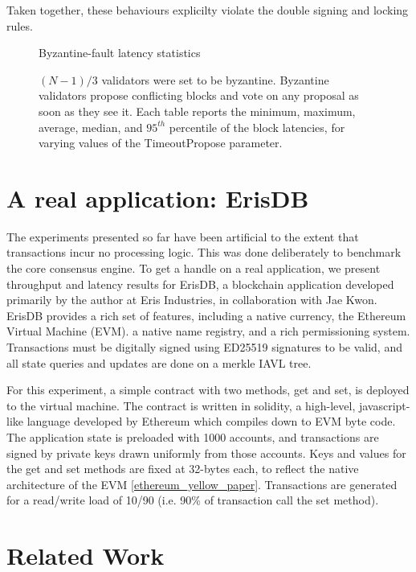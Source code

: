 Taken together, these behaviours explicilty violate the double signing and locking rules. 

\begin{figure}[]
	Byzantine-fault latency statistics	
	
	\caption[Latency statistics under byzantine faults]{$(N-1)/3$ validators were set to be byzantine.
Byzantine validators propose conflicting blocks and vote on any proposal as soon as they see it.
Each table reports the minimum, maximum, average, median, and $95^{th}$ percentile of the block latencies, for varying values of the TimeoutPropose parameter.}
	\label{fig:exp:byz_failure}
\end{figure}


\section{A real application: ErisDB}

The experiments presented so far have been artificial to the extent that transactions incur no processing logic.
This was done deliberately to benchmark the core consensus engine. 
To get a handle on a real application, we present throughput and latency results for ErisDB, 
a blockchain application developed primarily by the author at Eris Industries, in collaboration with Jae Kwon.
ErisDB provides a rich set of features, including a native currency, the Ethereum Virtual Machine (EVM).
a native name registry, and a rich permissioning system.
Transactions must be digitally signed using ED25519 signatures to be valid, and all state queries and updates are done on a merkle IAVL tree.

For this experiment, a simple contract with two methods, get and set, is deployed to the virtual machine.
The contract is written in solidity, a high-level, javascript-like language developed by Ethereum which compiles down to EVM byte code.
The application state is preloaded with 1000 accounts, and transactions are signed by private keys drawn uniformly from those accounts.
Keys and values for the get and set methods are fixed at 32-bytes each, to reflect the native architecture of the EVM \ref{ethereum_yellow_paper}.
Transactions are generated for a read/write load of 10/90 (i.e. 90\% of transaction call the set method).

\section{Related Work}
